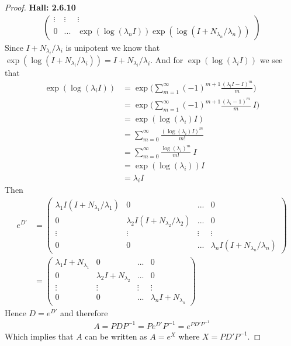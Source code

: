 \documentclass[11pt]{article}
\theoremstyle{definition}
\begin{document}
\begin{proof}{\textbf{Hall: 2.6.10}}
\begin{align*}
\begin{pmatrix}
            \vdots & \vdots & \vdots\\
            0 & ... & \exp(\log(\lambda_nI)) \exp(\log(I + N_{\lambda_n}/\lambda_n))
        \end{pmatrix}
    \end{align*}
    Since $I + N_{\lambda_i}/\lambda_i$ is unipotent we know that
    $\exp(\log(I + N_{\lambda_i}/\lambda_i)) = I + N_{\lambda_i}/\lambda_i$.
    And for $\exp(\log(\lambda_iI))$ we see that 
    \begin{align*}
        \exp(\log(\lambda_iI))
        &= \exp\bigg(\sum_{m = 1}^\infty (-1)^{m+1} \frac{(\lambda_i I - I)^m}{m}\bigg)\\
        &= \exp\bigg(\sum_{m = 1}^\infty (-1)^{m+1} \frac{(\lambda_i-1)^m}{m}~I\bigg)\\
        &= \exp(\log(\lambda_i)I)\\
        &= \sum_{m=0}^\infty \frac{(\log(\lambda_i)I)^m}{m!}\\
        &= \sum_{m=0}^\infty \frac{\log(\lambda_i)^m}{m!}~I\\
        &= \exp(\log(\lambda_i))I\\
        &= \lambda_iI
    \end{align*}
    Then
    \begin{align*}
        e^{D'} &= \begin{pmatrix}
            \lambda_1I(I + N_{\lambda_1}/\lambda_1) & 0 & ... & 0 \\
            0 & \lambda_2I(I + N_{\lambda_2}/\lambda_2) & ... & 0 \\
            \vdots & \vdots & \vdots & \vdots\\
            0 & 0 & ... & \lambda_n I(I + N_{\lambda_n}/\lambda_n)
        \end{pmatrix}\\
        &= \begin{pmatrix}
            \lambda_1I + N_{\lambda_1} & 0 & ... & 0 \\
            0 & \lambda_2I + N_{\lambda_2} & ... & 0 \\
            \vdots & \vdots & \vdots & \vdots\\
            0 & 0 & ... & \lambda_n I + N_{\lambda_n}
        \end{pmatrix}
    \end{align*}
    Hence $D = e^{D'}$ and therefore
    \begin{align*}
        A = PDP^{-1} = Pe^{D'}P^{-1} = e^{PD'P^{-1}}
    \end{align*}
    Which implies that $A$ can be written as $A = e^{X}$ where $X = PD'P^{-1}$.

\end{proof}
\end{document}
